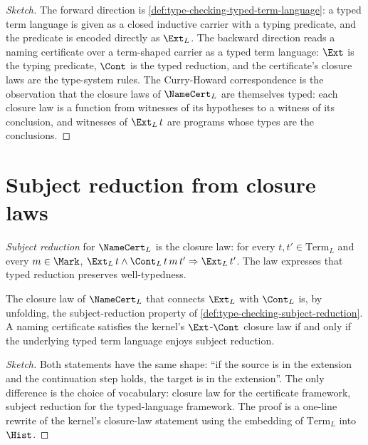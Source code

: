 \begin{proof}[Sketch]
The forward direction is \autoref{def:type-checking-typed-term-language}: a typed term language is given as a closed inductive carrier with a typing predicate, and the predicate is encoded directly as $\Ext_L$. The backward direction reads a naming certificate over a term-shaped carrier as a typed term language: $\Ext$ is the typing predicate, $\Cont$ is the typed reduction, and the certificate's closure laws are the type-system rules. The Curry-Howard correspondence is the observation that the closure laws of $\NameCert_L$ are themselves typed: each closure law is a function from witnesses of its hypotheses to a witness of its conclusion, and witnesses of $\Ext_L\,t$ are programs whose types are the conclusions.
\end{proof}

\section{Subject reduction from closure laws}
\label{sec:type-checking-subject-reduction}

\begin{definition}
\label{def:type-checking-subject-reduction}
\emph{Subject reduction} for $\NameCert_L$ is the closure law: for every $t, t' \in \mathrm{Term}_L$ and every $m \in \Mark$, $\Ext_L\,t \wedge \Cont_L\,t\,m\,t' \Rightarrow \Ext_L\,t'$. The law expresses that typed reduction preserves well-typedness.
\end{definition}

\begin{theorem}
\label{thm:type-checking-closure-law-subject-reduction}
The closure law of $\NameCert_L$ that connects $\Ext_L$ with $\Cont_L$ is, by unfolding, the subject-reduction property of \autoref{def:type-checking-subject-reduction}. A naming certificate satisfies the kernel's $\Ext$-$\Cont$ closure law if and only if the underlying typed term language enjoys subject reduction.
\end{theorem}

\begin{proof}[Sketch]
Both statements have the same shape: ``if the source is in the extension and the continuation step holds, the target is in the extension''. The only difference is the choice of vocabulary: closure law for the certificate framework, subject reduction for the typed-language framework. The proof is a one-line rewrite of the kernel's closure-law statement using the embedding of $\mathrm{Term}_L$ into $\Hist$.
\end{proof}

